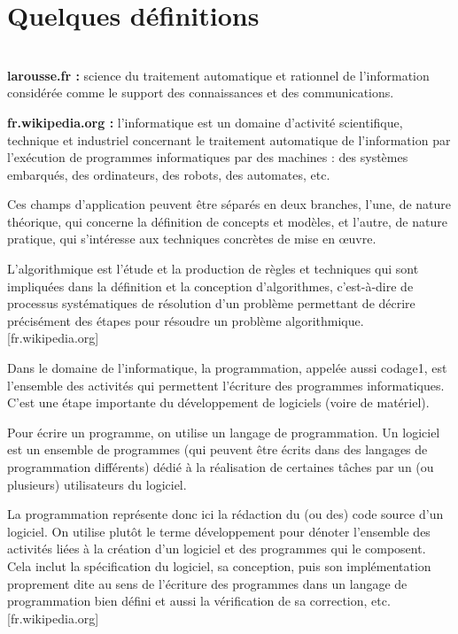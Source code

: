 \section{Quelques définitions}

\begin{defi}[Informatique]
~\\

\textbf{larousse.fr :} science du traitement automatique et rationnel de l'information considérée comme le support des connaissances et des communications.

\textbf{fr.wikipedia.org :} l'informatique est un domaine d'activité scientifique, technique et industriel concernant le traitement automatique de l'information par l'exécution de programmes informatiques par des machines : des systèmes embarqués, des ordinateurs, des robots, des automates, etc.

Ces champs d'application peuvent être séparés en deux branches, l'une, de nature théorique, qui concerne la définition de concepts et modèles, et l'autre, de nature pratique, qui s'intéresse aux techniques concrètes de mise en œuvre.
\end{defi}



\begin{defi}[Algorithmique]
L'algorithmique est l'étude et la production de règles et techniques qui sont impliquées dans la définition et la conception d'algorithmes, c'est-à-dire de processus systématiques de résolution d'un problème permettant de décrire précisément des étapes pour résoudre un problème algorithmique. [fr.wikipedia.org]
\end{defi}


\begin{defi}[Programmation]
Dans le domaine de l'informatique, la programmation, appelée aussi codage1, est l'ensemble des activités qui permettent l'écriture des programmes informatiques. C'est une étape importante du développement de logiciels (voire de matériel).

Pour écrire un programme, on utilise un langage de programmation. Un logiciel est un ensemble de programmes (qui peuvent être écrits dans des langages de programmation différents) dédié à la réalisation de certaines tâches par un (ou plusieurs) utilisateurs du logiciel.

La programmation représente donc ici la rédaction du (ou des) code source d'un logiciel. On utilise plutôt le terme développement pour dénoter l'ensemble des activités liées à la création d'un logiciel et des programmes qui le composent. Cela inclut la spécification du logiciel, sa conception, puis son implémentation proprement dite au sens de l'écriture des programmes dans un langage de programmation bien défini et aussi la vérification de sa correction, etc. [fr.wikipedia.org]
\end{defi}



